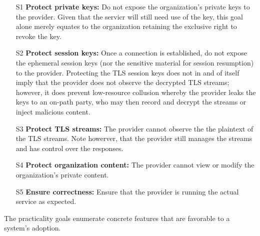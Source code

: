 \begin{enumerate}
    \item[S1] \textbf{Protect private keys:}
        Do not expose the organization's private keys to the provider.
        Given that the servicr will still need use of the key, this goal alone
        merely equates to the organization retaining the exclusive right to
        revoke the key.
    
    \item[S2] \textbf{Protect session keys:}
        Once a connection is established, do not expose the ephemeral session keys (nor
        the sensitive material for session resumption) to the provider.
        Protecting the TLS session keys does not in and of itself imply that
        the provider does not observe the decrypted TLS streams; however, it does
        prevent low-resource collusion whereby the provider leaks the keys to
        an on-path party, who may then record and decrypt the streams or
        inject malicious content.

    \item[S3] \textbf{Protect TLS streams:}
        The provider cannot observe the the plaintext of the TLS streams.
        Note howerver, that the provider still manages the streams and has
        control over the responses.

    \item[S4] \textbf{Protect organization content:}
        The provider cannot view or modify the organization's private content.

    \item[S5] \textbf{Ensure correctness:}
        Ensure that the provider is running the actual service as expected.

\end{enumerate}


%
The practicality goals enumerate concrete features that are favorable to a
system's adoption.

